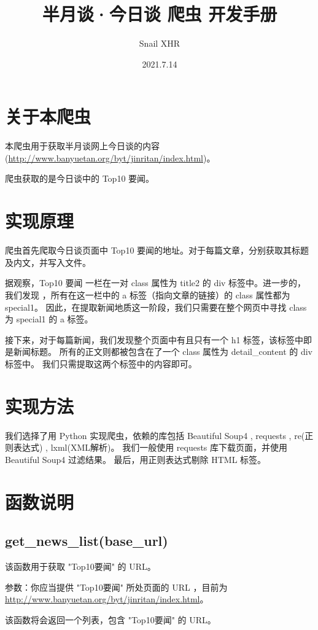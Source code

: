 \documentclass{article}
\title{半月谈·今日谈 爬虫 开发手册}
\author{Snail XHR}
\date{2021.7.14}
\begin{document}
    \maketitle
    \newpage
    \renewcommand{\contentsname}{目录}
    \tableofcontents
    \newpage
    \noindent\section{关于本爬虫}
    本爬虫用于获取半月谈网上今日谈的内容
    (\url{http://www.banyuetan.org/byt/jinritan/index.html})。
    \par
    爬虫获取的是今日谈中的 Top10 要闻。
    
    \noindent\section{实现原理}
    爬虫首先爬取今日谈页面中 Top10 要闻的地址。对于每篇文章，分别获取其标题及内文，并写入文件。
    \par
    据观察，Top10 要闻 一栏在一对 class 属性为 title2 的 div 标签中。进一步的，我们发现
    ，所有在这一栏中的 a 标签（指向文章的链接）的 class 属性都为 special1。
    因此，在提取新闻地质这一阶段，我们只需要在整个网页中寻找 class 为 special1 的 a 标签。
    \par
    接下来，对于每篇新闻，我们发现整个页面中有且只有一个 h1 标签，该标签中即是新闻标题。
    所有的正文则都被包含在了一个 class 属性为 detail\_content 的 div 标签中。
    我们只需提取这两个标签中的内容即可。
    \noindent\section{实现方法}
    我们选择了用 Python 实现爬虫，依赖的库包括 Beautiful Soup4 , requests , re(正则表达式) , lxml(XML解析)。
    我们一般使用 requests 库下载页面，并使用 Beautiful Soup4 过滤结果。
    最后，用正则表达式剔除 HTML 标签。
    \noindent\section{函数说明}
    \subsection{get\_news\_list(base\_url)}
    该函数用于获取 "Top10要闻" 的 URL。
    \par
    参数：你应当提供 "Top10要闻" 所处页面的 URL ，目前为
    \url{http://www.banyuetan.org/byt/jinritan/index.html}。
    \par
    该函数将会返回一个列表，包含 "Top10要闻" 的 URL。
\end{document}
